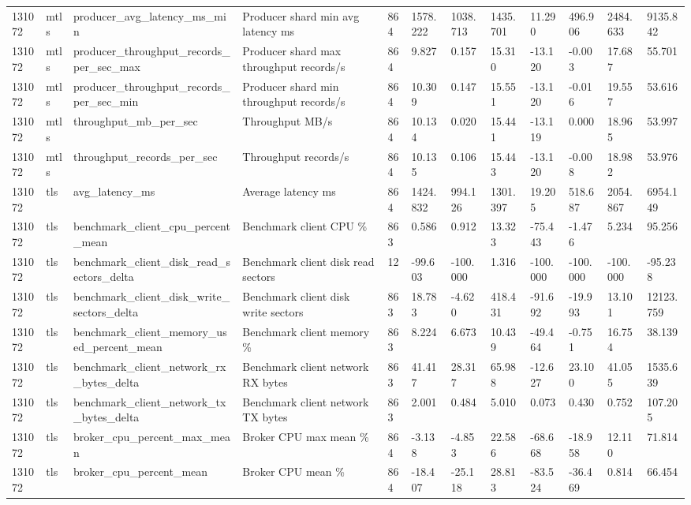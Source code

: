 \begin{longtable}{llllllllllll}
131072 & mtls & producer\_avg\_latency\_ms\_min & Producer shard min avg latency ms & 864 & 1578.222 & 1038.713 & 1435.701 & 11.290 & 496.906 & 2484.633 & 9135.842 \\
131072 & mtls & producer\_throughput\_records\_per\_sec\_max & Producer shard max throughput records/s & 864 & 9.827 & 0.157 & 15.310 & -13.120 & -0.003 & 17.687 & 55.701 \\
131072 & mtls & producer\_throughput\_records\_per\_sec\_min & Producer shard min throughput records/s & 864 & 10.309 & 0.147 & 15.551 & -13.120 & -0.016 & 19.557 & 53.616 \\
131072 & mtls & throughput\_mb\_per\_sec & Throughput MB/s & 864 & 10.134 & 0.020 & 15.441 & -13.119 & 0.000 & 18.965 & 53.997 \\
131072 & mtls & throughput\_records\_per\_sec & Throughput records/s & 864 & 10.135 & 0.106 & 15.443 & -13.120 & -0.008 & 18.982 & 53.976 \\
131072 & tls & avg\_latency\_ms & Average latency ms & 864 & 1424.832 & 994.126 & 1301.397 & 19.205 & 518.687 & 2054.867 & 6954.149 \\
131072 & tls & benchmark\_client\_cpu\_percent\_mean & Benchmark client CPU \% & 863 & 0.586 & 0.912 & 13.323 & -75.443 & -1.476 & 5.234 & 95.256 \\
131072 & tls & benchmark\_client\_disk\_read\_sectors\_delta & Benchmark client disk read sectors & 12 & -99.603 & -100.000 & 1.316 & -100.000 & -100.000 & -100.000 & -95.238 \\
131072 & tls & benchmark\_client\_disk\_write\_sectors\_delta & Benchmark client disk write sectors & 863 & 18.783 & -4.620 & 418.431 & -91.692 & -19.993 & 13.101 & 12123.759 \\
131072 & tls & benchmark\_client\_memory\_used\_percent\_mean & Benchmark client memory \% & 863 & 8.224 & 6.673 & 10.439 & -49.464 & -0.751 & 16.754 & 38.139 \\
131072 & tls & benchmark\_client\_network\_rx\_bytes\_delta & Benchmark client network RX bytes & 863 & 41.417 & 28.317 & 65.988 & -12.627 & 23.100 & 41.055 & 1535.639 \\
131072 & tls & benchmark\_client\_network\_tx\_bytes\_delta & Benchmark client network TX bytes & 863 & 2.001 & 0.484 & 5.010 & 0.073 & 0.430 & 0.752 & 107.205 \\
131072 & tls & broker\_cpu\_percent\_max\_mean & Broker CPU max mean \% & 864 & -3.138 & -4.853 & 22.586 & -68.668 & -18.958 & 12.110 & 71.814 \\
131072 & tls & broker\_cpu\_percent\_mean & Broker CPU mean \% & 864 & -18.407 & -25.118 & 28.813 & -83.524 & -36.469 & 0.814 & 66.454 \\

\end{longtable}
